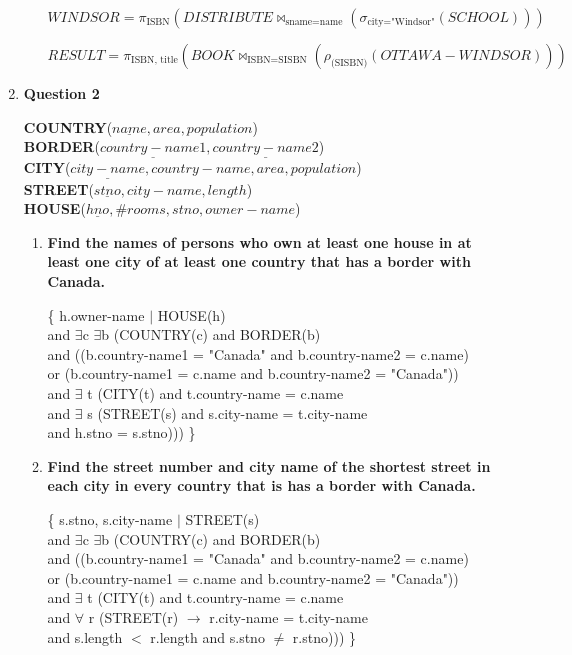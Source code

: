 \documentclass[11pt]{article}
\begin{document}
\begin{enumerate}
\begin{enumerate}
	$WINDSOR=\pi_{\text{ISBN}}(DISTRIBUTE\Join_{\text{sname=name}}(\sigma_{\text{city="Windsor"}}(SCHOOL)))$
	
	$RESULT=\pi_{\text{ISBN, title}}(BOOK \Join_{\text{ISBN=SISBN}} (\rho_{\text{(SISBN)}} (OTTAWA-WINDSOR)))$

\end{enumerate}

\newpage
\item[] \textbf{Question 2}

\begin{center}
\textbf{COUNTRY}($\underline{name}, area, population$) \\
\textbf{BORDER}($\underline{country-name1}, \underline{country-name2}$) \\
\textbf{CITY}($\underline{city-name}, country-name, area, population$) \\
\textbf{STREET}($\underline{stno}, city-name, length$) \\
\textbf{HOUSE}($\underline{hno}, \#rooms, stno, owner-name$) \\
\end{center}

\begin{enumerate}
	
	\item \textbf{Find the names of persons who own at least one house in at least one city of at least one country that has a border with Canada.}
	
	\{ h.owner-name $\vert$ HOUSE(h) \\
	and $\exists$c $\exists$b (COUNTRY(c) and BORDER(b) \\
		and ((b.country-name1 = "Canada" and b.country-name2 = c.name) \\
		or (b.country-name1 = c.name and b.country-name2 = "Canada")) \\
	and $\exists$ t (CITY(t) and t.country-name = c.name \\
	and $\exists$ s (STREET(s) and s.city-name = t.city-name \\
	and h.stno = s.stno))) \}
	
	\item \textbf{Find the street number and city name of the shortest street in each city in every country that is has a border with Canada.}
	
	\{ s.stno, s.city-name $\vert$ STREET(s) \\
	and $\exists$c $\exists$b (COUNTRY(c) and BORDER(b) \\
	and ((b.country-name1 = "Canada" and b.country-name2 = c.name) \\
	or (b.country-name1 = c.name and b.country-name2 = "Canada")) \\
	and $\exists$ t (CITY(t) and t.country-name = c.name \\
	and $\forall$ r 
	(STREET(r) $\rightarrow$ r.city-name = t.city-name \\
	and s.length $<$ r.length and s.stno $\neq$ r.stno))) \}
	

\end{enumerate}
\end{enumerate}
\end{document}
